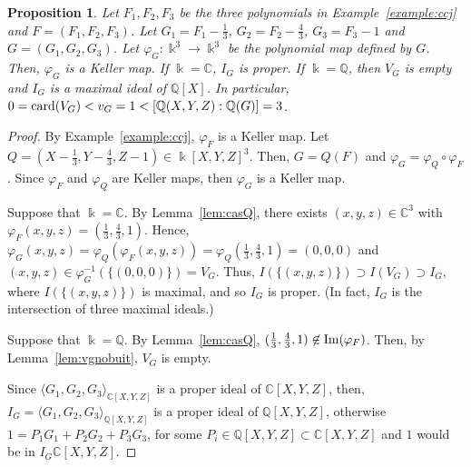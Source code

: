 \documentclass[11pt,reqno]{amsart}
\newtheorem{proposition}[theorem]{Proposition}
\theoremstyle{definition}
\newcommand{\mbk}{\mbox{$\Bbbk$}}
\newcommand{\mbc}{\mbox{$\mathbb{C}$}}
\newcommand{\mbq}{\mbox{$\mathbb{Q}$}}
\newcommand{\card}{\mbox{${\rm card}$}}
\newcommand{\im}{\mbox{${\rm Im}$}}
\begin{document}
\begin{proposition}\label{prop:casQ}
Let $F_1,F_2,F_3$ be the three polynomials in {\rm Example~\ref{example:ccj}} and $F=(F_1,F_2,F_3)$. 
Let $G_1=F_1-\tfrac{1}{3}$, $G_2=F_2-\tfrac{4}{3}$, $G_3=F_3-1$ and $G=(G_1,G_2,G_3)$. 
Let $\varphi_G:\mbk^3\to \mbk^3$ be the polynomial map defined by $G$. Then, $\varphi_G$ is a Keller map. If $\mbk=\mbc$, $I_G$ is proper. If $\mbk=\mbq$, then $V_G$ is empty and $I_G$ is a maximal ideal of $\mbq[X]$. In particular, $0=\card(V_G)<v_G=1<[\mbq(X,Y,Z):\mbq(G)]=3$.
\end{proposition}
\begin{proof} 
By Example~\ref{example:ccj}, $\varphi_F$ is a Keller map. Let $Q=(X-\tfrac{1}{3},Y-\tfrac{4}{3},Z-1)\in\mbk[X,Y,Z]^3$. Then, $G=Q(F)$ and $\varphi_G=\varphi_Q\circ\varphi_F$. Since $\varphi_F$ and $\varphi_Q$ are Keller maps, then $\varphi_G$ is a Keller map. 

Suppose that $\mbk=\mbc$. By Lemma~\ref{lem:casQ}, there exists $(x,y,z)\in\mbc^3$ with $\varphi_F(x,y,z)=(\tfrac{1}{3},\tfrac{4}{3},1)$. Hence, $\varphi_G(x,y,z)=\varphi_Q(\varphi_F(x,y,z))=
\varphi_Q(\tfrac{1}{3},\tfrac{4}{3},1)=(0,0,0)$ and $(x,y,z)\in \varphi_G^{-1}(\{(0,0,0)\})=V_G$. Thus, 
$I(\{(x,y,z)\})\supset I(V_G)\supset I_G$, where $I(\{(x,y,z)\})$ is maximal, and so $I_G$ is proper.
(In fact, $I_G$ is the intersection of three maximal ideals.)

Suppose that $\mbk=\mbq$. By Lemma~\ref{lem:casQ}, $(\tfrac{1}{3},\tfrac{4}{3},1)\not\in\im(\varphi_F)$. 
Then, by Lemma~\ref{lem:vgnobuit}, $V_G$ is empty. 

Since $\langle G_1,G_2,G_3\rangle_{\mathbb{C}[X,Y,Z]}$ is a proper ideal of $\mbc[X,Y,Z]$, then, $I_G=\langle G_1,G_2,G_3\rangle_{\mathbb{Q}[X,Y,Z]}$
is a proper ideal of $\mbq[X,Y,Z]$, otherwise $1=P_1G_1+P_2G_2+P_3G_3$, for some $P_i\in\mbq[X,Y,Z]\subset\mbc[X,Y,Z]$ and $1$ would be in $I_{G}\mbc[X,Y,Z]$.


\end{proof}
\end{document}
